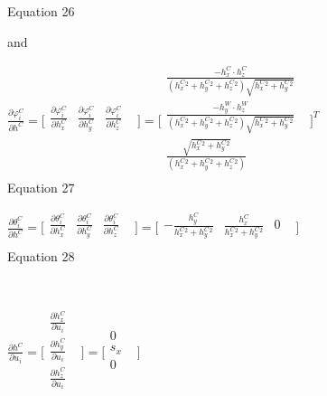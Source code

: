 Equation 26

and

$\frac{\partial \varphi _{i}^{C}}{\partial h^{C}}=\lbrack 
\begin{matrix}
\frac{\partial \varphi _{i}^{C}}{\partial h_{x}^{C}} & \frac{\partial 
\varphi _{i}^{C}}{\partial h_{y}^{C}} & \frac{\partial \varphi 
_{i}^{C}}{\partial h_{z}^{C}} & \\
\end{matrix}
\rbrack =\lbrack \begin{matrix}
\frac{-h_{x}^{C}\cdot 
h_{z}^{C}}{(h_{x}^{C}^{2}+h_{y}^{C}^{2}+h_{z}^{C}^{2})\sqrt{h_{x}^{C}^{2}+h_{y}^{C}^{2}}} 
& \\
\frac{-h_{y}^{W}\cdot 
h_{z}^{W}}{(h_{x}^{C}^{2}+h_{y}^{C}^{2}+h_{z}^{C}^{2})\sqrt{h_{x}^{C}^{2}+h_{y}^{C}^{2}}} 
& \\

\frac{\sqrt{h_{x}^{C}^{2}+h_{y}^{C}^{2}}}{(h_{x}^{C}^{2}+h_{y}^{C}^{2}+h_{z}^{C}^{2})} 
& \\
\end{matrix}
\rbrack ^{T}$\\


Equation 27

$\frac{\partial \theta _{i}^{C}}{\partial h^{C}}=\lbrack \begin{matrix}
\frac{\partial \theta _{i}^{C}}{\partial h_{x}^{C}} & \frac{\partial 
\theta _{i}^{C}}{\partial h_{y}^{C}} & \frac{\partial \theta 
_{i}^{C}}{\partial h_{z}^{C}} & \\
\end{matrix}
\rbrack =\lbrack \begin{matrix}
-\frac{h_{y}^{C}}{h_{x}^{C}^{2}+h_{y}^{C}^{2}} & 
\frac{h_{x}^{C}}{h_{x}^{C}^{2}+h_{y}^{C}^{2}} & 0 & \\
\end{matrix}
\rbrack $\\


Equation 28

\ \ \ \ 

$\frac{\partial h^{C}}{\partial u_{i}}=\lbrack \begin{matrix}
\frac{\partial h_{x}^{C}}{\partial u_{i}} & \\
\frac{\partial h_{y}^{C}}{\partial u_{i}} & \\
\frac{\partial h_{z}^{C}}{\partial u_{i}} & \\
\end{matrix}
\rbrack =\lbrack \begin{matrix}
0 & \\
s_{x} & \\
0 & \\
\end{matrix}
\rbrack $\\


